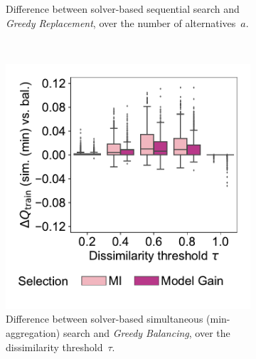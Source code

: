 \documentclass{article}
\theoremstyle{definition}
\begin{document}
\begin{figure}[p]
\begin{subfigure}[t]{0.48\textwidth}
		\caption{
			Difference between solver-based sequential search and \emph{Greedy Replacement}, over the number of alternatives~$a$.
		}
		\label{fig:afs:impact-search-heuristics-metric-diff-seq-num-alternatives}
	\end{subfigure}
	\\ \vspace{\baselineskip}
	\begin{subfigure}[t]{0.48\textwidth}
		\centering
		\includegraphics[width=\textwidth, trim=15 30 15 15, clip]{plots/afs-impact-search-heuristics-metric-diff-sim-tau.pdf}
		\caption{
			Difference between solver-based simultaneous (min-aggregation) search and \emph{Greedy Balancing}, over the dissimilarity threshold~$\tau$.
		}
		\label{fig:afs:impact-search-heuristics-metric-diff-sim-tau}
	\end{subfigure}
	\hfill
	\begin{subfigure}[t]{0.48\textwidth}
		\centering

\end{subfigure}
\end{figure}
\end{document}
